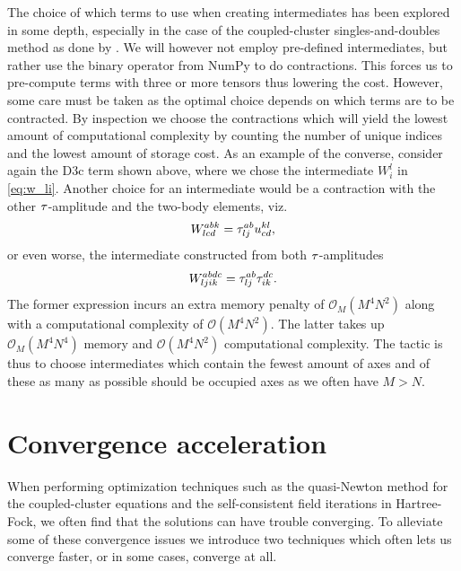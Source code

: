             The choice of which terms to use when creating intermediates has
            been explored in some depth, especially in the case of the
            coupled-cluster singles-and-doubles method as done by
            \citeauthor{gauss1995coupled} \cite{gauss1995coupled}.
            We will however not employ pre-defined intermediates, but rather use
            the binary operator  from NumPy to do
            contractions.
            This forces us to pre-compute terms with three or more tensors thus
            lowering the cost.
            However, some care must be taken as the optimal choice depends on
            which terms are to be contracted.
            By inspection we choose the contractions which will yield the lowest
            amount of computational complexity by counting the number of unique
            indices and the lowest amount of storage cost.
            As an example of the converse, consider again the D3c term shown above,
            where we chose the intermediate $W^{l}_{i}$ in \autoref{eq:w_li}.
            Another choice for an intermediate would be a contraction with the
            other $\tau$-amplitude and the two-body elements, viz.
            \begin{align}
                W^{abk}_{lcd} = \tau^{ab}_{lj} u^{kl}_{cd},
            \end{align}
            or even worse, the intermediate constructed from both
            $\tau$-amplitudes
            \begin{align}
                W^{abdc}_{ljik} = \tau^{ab}_{lj} \tau^{dc}_{ik}.
            \end{align}
            The former expression incurs an extra memory penalty of
            $\mathcal{O}_M(M^4 N^2)$ along with a computational complexity of
            $\mathcal{O}(M^4 N^2)$.
            The latter takes up $\mathcal{O}_M(M^4 N^4)$ memory and
            $\mathcal{O}(M^4 N^2)$ computational complexity.
            The tactic is thus to choose intermediates which contain the fewest
            amount of axes and of these as many as possible should be occupied
            axes as we often have $M > N$.


    \section{Convergence acceleration}
        \label{sec:convergence}
        When performing optimization techniques such as the quasi-Newton method
        for the coupled-cluster equations and the self-consistent field
        iterations in Hartree-Fock, we often find that the solutions can have
        trouble converging.
        To alleviate some of these convergence issues we introduce two
        techniques which often lets us converge faster, or in some cases,
        converge at all.

